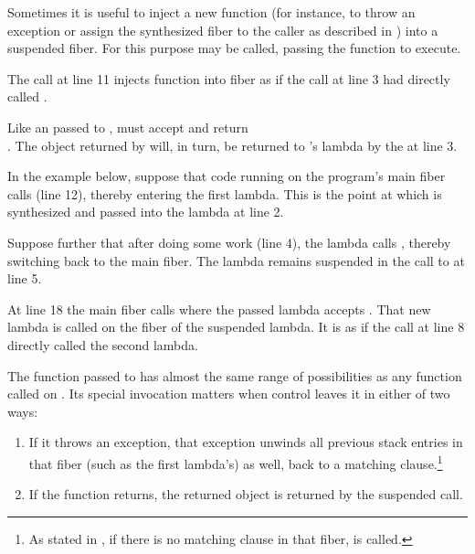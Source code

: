 \label{resumewith}
Sometimes it is useful to inject a new function (for instance, to throw an
exception or assign the synthesized fiber to the caller as described in
) into a suspended fiber. For this purpose
\anyresumewith may be called, passing the function  to execute.


The \resumewith call at line 11 injects function  into
fiber  as if the \resume call at line 3 had directly
called .

Like an \entryfn passed to \fiber,  must accept
 and return\\
\fiber. The \fiber object returned by  will, in turn, be returned
to 's lambda by the \resume at line 3.

In the example below, suppose that code running on the program's main fiber
calls \resume (line 12), thereby entering the first lambda. This is the point
at which  is synthesized and passed into the lambda at line 2.

Suppose further that after doing some work (line 4), the lambda calls
, thereby switching back to the main fiber. The lambda remains
suspended in the call to  at line 5.

At line 18 the main fiber calls  where the passed lambda
accepts . That new lambda is called on the fiber of the suspended
lambda. It is as if the  call at line 8 directly called the second
lambda.

The function passed to \resumewith has almost the same range of possibilities as
any function called on . Its special invocation
matters when control leaves it in either of two ways:

\begin{enumerate}
  \item If it throws an exception, that exception unwinds all previous stack
        entries in that fiber (such as the first lambda's) as well, back to
        a matching  clause.\footnote{As stated
        in , if there is no matching 
        clause in that fiber,  is called.}
  \item If the function returns, the returned \fiber object is returned by
        the suspended \anyresume call.
\end{enumerate}

